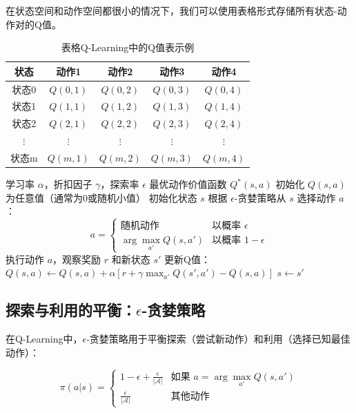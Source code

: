 在状态空间和动作空间都很小的情况下，我们可以使用表格形式存储所有状态-动作对的Q值。

\begin{table}[H]
\centering
\caption{表格Q-Learning中的Q值表示例}
\begin{tabular}{c|cccc}
\hline
\textbf{状态} & \textbf{动作1} & \textbf{动作2} & \textbf{动作3} & \textbf{动作4} \\
\hline
状态0 & $Q(0,1)$ & $Q(0,2)$ & $Q(0,3)$ & $Q(0,4)$ \\
状态1 & $Q(1,1)$ & $Q(1,2)$ & $Q(1,3)$ & $Q(1,4)$ \\
状态2 & $Q(2,1)$ & $Q(2,2)$ & $Q(2,3)$ & $Q(2,4)$ \\
$\vdots$ & $\vdots$ & $\vdots$ & $\vdots$ & $\vdots$ \\
状态m & $Q(m,1)$ & $Q(m,2)$ & $Q(m,3)$ & $Q(m,4)$ \\
\hline
\end{tabular}
\end{table}

\begin{algorithm}[H]
\caption{表格Q-Learning算法}
\begin{algorithmic}[1]
\REQUIRE 学习率 $\alpha$，折扣因子 $\gamma$，探索率 $\epsilon$
\ENSURE 最优动作价值函数 $Q^*(s, a)$
\STATE 初始化 $Q(s, a)$ 为任意值（通常为0或随机小值）
    \STATE 初始化状态 $s$
        \STATE 根据 $\epsilon$-贪婪策略从 $s$ 选择动作 $a$：
        \[
        a = \begin{cases}
        \text{随机动作} & \text{以概率 } \epsilon \\
        \arg\max_{a'} Q(s, a') & \text{以概率 } 1-\epsilon
        \end{cases}
        \]
        \STATE 执行动作 $a$，观察奖励 $r$ 和新状态 $s'$
        \STATE 更新Q值：$Q(s, a) \leftarrow Q(s, a) + \alpha [r + \gamma \max_{a'} Q(s', a') - Q(s, a)]$
        \STATE $s \leftarrow s'$
    \ENDWHILE
\ENDFOR
\end{algorithmic}
\end{algorithm}

\subsection{探索与利用的平衡：$\epsilon$-贪婪策略}

在Q-Learning中，$\epsilon$-贪婪策略用于平衡探索（尝试新动作）和利用（选择已知最佳动作）：

\[
\pi(a|s) = \begin{cases}
1 - \epsilon + \frac{\epsilon}{|\mathcal{A}|} & \text{如果 } a = \arg\max_{a'} Q(s, a') \\
\frac{\epsilon}{|\mathcal{A}|} & \text{其他动作}
\end{cases}
\]

